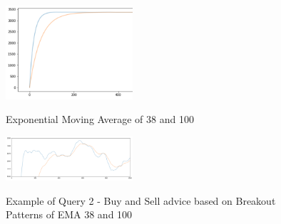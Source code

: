 \begin{figure}[!ht]
    \begin{center}
        \includegraphics[width=0.42\textwidth]{./images/query2_example_200.png}
        \label{fig:EMA200}
        \caption{Exponential Moving Average of 38 and 100}
    \end{center}
\end{figure}



\begin{figure}[!ht]
    \begin{center}
        \includegraphics[width=0.42\textwidth]{./images/query2_example.png}
        \label{fig:EMAs}
        \caption{Example of Query 2 - Buy and Sell advice based on Breakout Patterns of EMA 38 and 100 }
    \end{center}
\end{figure}
